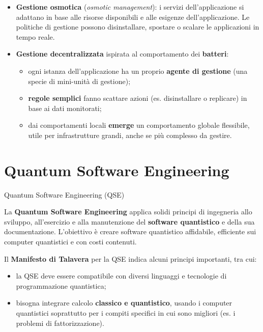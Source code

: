 \begin{itemize}
\tightlist
\item
  \textbf{Gestione osmotica} (\emph{osmotic management}): i servizi
  dell'applicazione si adattano in base alle risorse disponibili e alle
  esigenze dell'applicazione. Le politiche di gestione possono
  disinstallare, spostare o scalare le applicazioni in tempo reale.
\item
  \textbf{Gestione decentralizzata} ispirata al comportamento dei
  \textbf{batteri}:

  \begin{itemize}
  \tightlist
  \item
    ogni istanza dell'applicazione ha un proprio \textbf{agente di
    gestione} (una specie di mini-unità di gestione);
  \item
    \textbf{regole semplici} fanno scattare azioni (es. disinstallare o
    replicare) in base ai dati monitorati;
  \item
    dai comportamenti locali \textbf{emerge} un comportamento globale
    flessibile, utile per infrastrutture grandi, anche se più complesso
    da gestire.
  \end{itemize}
\end{itemize}

\section{Quantum Software
Engineering}\label{quantum-software-engineering}

\begin{boxdefinition}{Quantum Software Engineering (QSE)}

La \textbf{Quantum Software Engineering} applica solidi principi di
ingegneria allo sviluppo, all'esercizio e alla manutenzione del
\textbf{software quantistico} e della sua documentazione. L'obiettivo è
creare software quantistico affidabile, efficiente sui computer
quantistici e con costi contenuti.

\end{boxdefinition}

Il \textbf{Manifesto di Talavera} per la QSE indica alcuni principi
importanti, tra cui:

\begin{itemize}
\tightlist
\item
  la QSE deve essere compatibile con diversi linguaggi e tecnologie di
  programmazione quantistica;
\item
  bisogna integrare calcolo \textbf{classico e quantistico}, usando i
  computer quantistici soprattutto per i compiti specifici in cui sono
  migliori (es. i problemi di fattorizzazione).
\end{itemize}

